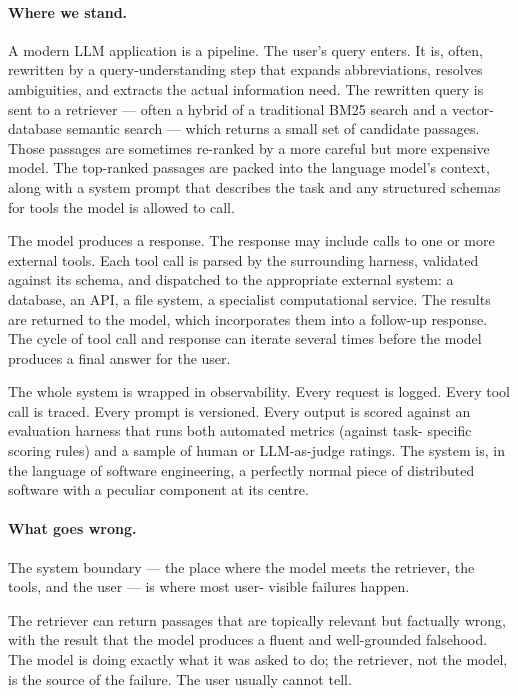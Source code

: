 \paragraph{Where we stand.} A modern LLM application is a pipeline. The user's query
enters. It is, often, rewritten by a query-understanding step
that expands abbreviations, resolves ambiguities, and extracts
the actual information need. The rewritten query is sent to a
retriever --- often a hybrid of a traditional BM25 search and
a vector-database semantic search --- which returns a small
set of candidate passages. Those passages are sometimes
re-ranked by a more careful but more expensive model. The
top-ranked passages are packed into the language model's
context, along with a system prompt that describes the task
and any structured schemas for tools the model is allowed to
call.

The model produces a response. The response may include calls
to one or more external tools. Each tool call is parsed by
the surrounding harness, validated against its schema, and
dispatched to the appropriate external system: a database, an
API, a file system, a specialist computational service. The
results are returned to the model, which incorporates them
into a follow-up response. The cycle of tool call and response
can iterate several times before the model produces a final
answer for the user.

The whole system is wrapped in observability. Every request
is logged. Every tool call is traced. Every prompt is
versioned. Every output is scored against an evaluation
harness that runs both automated metrics (against task-
specific scoring rules) and a sample of human or LLM-as-judge
ratings. The system is, in the language of software
engineering, a perfectly normal piece of distributed software
with a peculiar component at its centre.

\paragraph{What goes wrong.} The system boundary --- the place where the model meets the
retriever, the tools, and the user --- is where most user-
visible failures happen.

The retriever can return passages that are topically relevant
but factually wrong, with the result that the model produces
a fluent and well-grounded falsehood. The model is doing
exactly what it was asked to do; the retriever, not the model,
is the source of the failure. The user usually cannot tell.

